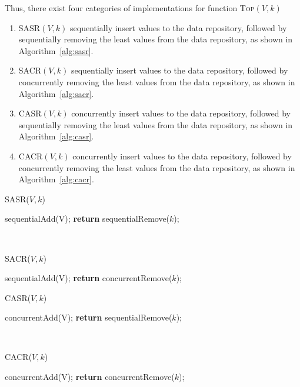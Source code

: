 \documentclass[conference]{IEEEtran}
\theoremstyle{remark}
\newcommand{\Fn}{\textsc{Top}}
\begin{document}
Thus, there exist four categories of implementations for function \Fn$(V,k)$
\begin{enumerate}
\item SASR$(V,k)$ sequentially insert values to the data repository, followed by sequentially removing the least values from the data repository, as shown in Algorithm~\ref{alg:sasr}.
\item SACR$(V,k)$ sequentially insert values to the data repository, followed by concurrently removing the least values from the data repository, as shown in Algorithm~\ref{alg:sacr}.
\item CASR$(V,k)$ concurrently insert values to the data repository, followed by sequentially removing the least values from the data repository, as shown in Algorithm~\ref{alg:casr}.
\item CACR$(V,k)$ concurrently insert values to the data repository, followed by concurrently removing the least values from the data repository, as shown in Algorithm~\ref{alg:cacr}.
\end{enumerate}

\begin{minipage}[t]{.45\linewidth}
\begin{algorithm}[H]
\caption{SASR($V,k$)}
\label{alg:sasr}
\begin{algorithmic}[1]
\STATE sequentialAdd(V);
\STATE \textbf{return} {sequentialRemove($k$)};
\end{algorithmic}
\end{algorithm}
\end{minipage}
~
\begin{minipage}[t]{.45\linewidth}
\begin{algorithm}[H]
\caption{SACR($V,k$)}
\label{alg:sacr}
\begin{algorithmic}[1]
\STATE sequentialAdd(V);
\STATE \textbf{return} {concurrentRemove($k$)};
\end{algorithmic}
\end{algorithm}
\end{minipage}

\begin{minipage}[t]{.45\linewidth}
\begin{algorithm}[H]
\caption{CASR($V,k$)}
\label{alg:casr}
\begin{algorithmic}[1]
\STATE concurrentAdd(V);
\STATE \textbf{return} {sequentialRemove($k$)};
\end{algorithmic}
\end{algorithm}
\end{minipage}
~
\begin{minipage}[t]{.45\linewidth}
\begin{algorithm}[H]
\caption{CACR($V,k$)}
\label{alg:cacr}
\begin{algorithmic}[1]
\STATE concurrentAdd(V);
\STATE \textbf{return} {concurrentRemove($k$)};
\end{algorithmic}
\end{algorithm}
\end{minipage}
\end{document}
